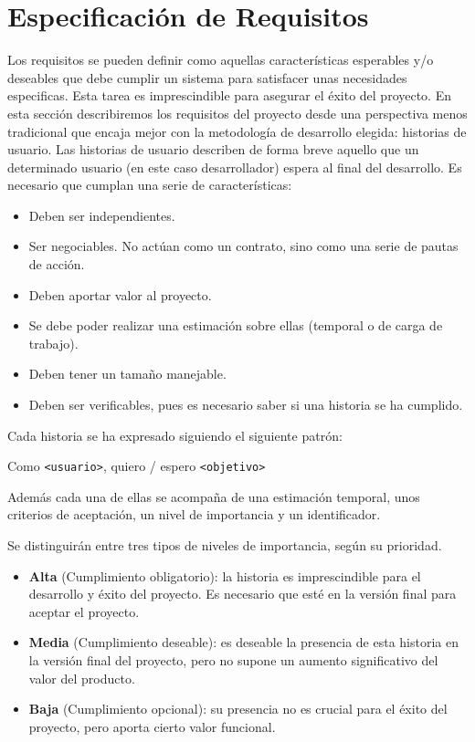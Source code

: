 \chapter{Especificación de Requisitos}
Los requisitos se pueden definir como aquellas características esperables y/o deseables que debe cumplir un sistema para satisfacer unas necesidades especificas. Esta tarea es imprescindible para asegurar el éxito del proyecto. En esta sección describiremos los requisitos del proyecto desde una perspectiva menos tradicional que encaja mejor con la metodología de desarrollo elegida: historias de usuario. Las historias de usuario describen de forma breve aquello que un determinado usuario (en este caso desarrollador) espera al final del desarrollo. Es necesario que cumplan una serie de características:
\begin{itemize}
    \item Deben ser independientes.
    \item Ser negociables. No actúan como un contrato, sino como una serie de pautas de acción.
    \item Deben aportar valor al proyecto.
    \item Se debe poder realizar una estimación sobre ellas (temporal o de carga de trabajo).
    \item Deben tener un tamaño manejable.
    \item Deben ser verificables, pues es necesario saber si una historia se ha cumplido.
\end{itemize}

Cada historia se ha expresado siguiendo el siguiente patrón:
\begin{center}
    Como \texttt{<usuario>}, quiero / espero \texttt{<objetivo>}
\end{center}

Además cada una de ellas se acompaña de una estimación temporal, unos criterios de aceptación, un nivel de importancia y un identificador.

Se distinguirán entre tres tipos de niveles de importancia, según su prioridad.
\begin{itemize}
    \item \textbf{Alta} (Cumplimiento obligatorio): la historia es imprescindible para el desarrollo y éxito del proyecto. Es necesario que esté en la versión final para aceptar el proyecto.
    \item \textbf{Media} (Cumplimiento deseable): es deseable la presencia de esta historia en la versión final del proyecto, pero no supone un aumento significativo del valor del producto.
    \item \textbf{Baja} (Cumplimiento opcional): su presencia no es crucial para el éxito del proyecto, pero aporta cierto valor funcional. 
\end{itemize}

